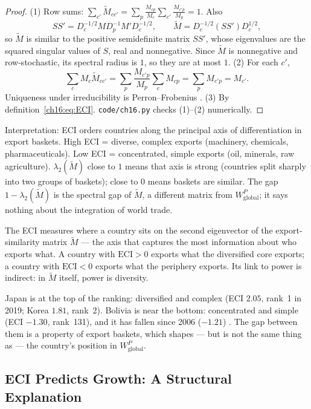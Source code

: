 \documentclass[../structural_economics_book.tex]{subfiles}
\begin{document}
\begin{proof}
(1) Row sums: $\sum_{c'}\tilde{M}_{cc'} = \sum_p \frac{M_{cp}}{M_c}\sum_{c'}\frac{M_{c'p}}{M_p} = 1$. Also
\[
SS' = D_c^{-1/2}MD_p^{-1}M'D_c^{-1/2}, \qquad \tilde{M} = D_c^{-1/2}(SS')D_c^{1/2},
\]
so $\tilde{M}$ is similar to the positive semidefinite matrix $SS'$, whose eigenvalues are the squared singular values of $S$, real and nonnegative. Since $\tilde{M}$ is nonnegative and row-stochastic, its spectral radius is $1$, so they are at most $1$. (2) For each $c'$,
\[
\textstyle\sum_c M_c\tilde{M}_{cc'} = \sum_p \frac{M_{c'p}}{M_p}\sum_c M_{cp} = \sum_p M_{c'p} = M_{c'}.
\]
Uniqueness under irreducibility is Perron--Frobenius \citep[Thm.~1.5]{seneta2006nonnegative}. (3) By definition~\eqref{ch16:eq:ECI}. \texttt{code/ch16.py} checks (1)--(2) numerically.
\end{proof}

Interpretation: ECI orders countries along the principal axis of differentiation in export baskets. High ECI = diverse, complex exports (machinery, chemicals, pharmaceuticals). Low ECI = concentrated, simple exports (oil, minerals, raw agriculture). $\lambda_2(\tilde{M})$ close to $1$ means that axis is strong (countries split sharply into two groups of baskets); close to $0$ means baskets are similar. The gap $1 - \lambda_2(\tilde{M})$ is the spectral gap of $\tilde{M}$, a different matrix from $W^P_{\text{global}}$; it says nothing about the integration of world trade.

\begin{intuition}
The ECI measures where a country sits on the second eigenvector of the export-similarity matrix $\tilde{M}$ --- the axis that captures the most information about who exports what. A country with $\text{ECI} > 0$ exports what the diversified core exports; a country with $\text{ECI} < 0$ exports what the periphery exports. Its link to power is indirect: in $\tilde{M}$ itself, power is diversity.

Japan is at the top of the ranking: diversified and complex (ECI $2.05$, rank~1 in 2019; Korea $1.81$, rank~2). Bolivia is near the bottom: concentrated and simple (ECI $-1.30$, rank~131), and it has fallen since 2006 ($-1.21$) \citep{growthlab2026atlas}. The gap between them is a property of export baskets, which shapes --- but is not the same thing as --- the country's position in $W^P_{\text{global}}$.
\end{intuition}


\subsection{ECI Predicts Growth: A Structural Explanation}
\end{document}
